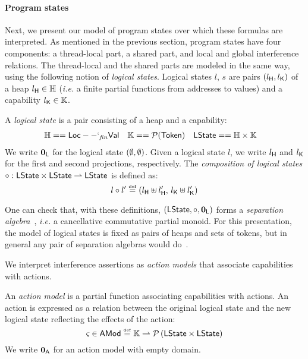 \paragraph{Program states}
Next, we present our model of program states over which these formulas
are interpreted. As mentioned in the previous section, program states
have four components: a thread-local part, a shared part, and local
and global interference relations. The thread-local and the shared
parts are modeled in the same way, using the following notion of
\emph{logical states}.  Logical states $l$, $s$ are pairs
$(l_{\textsf{H}}, l_{\textsf{K}})$ of a heap $l_{\textsf{H}}\in\mathbb{H}$
(\textit{i.e.} a finite partial functions from addresses to values)
and a capability $l_{\textsf{K}}\in\mathbb{K}$.

\begin{definition}
  A \emph{logical state} is a pair consisting of a heap and a capability:
  \begin{align*}
    \mathbb{H} &== \mathsf{Loc} --`_{\mathit{fin}} \mathsf{Val}&
    \mathbb{K} &== \mathcal{P}(\mathsf{Token})&
    \textsf{LState} &== \mathbb{H}\times \mathbb{K}
  \end{align*}
  We write $\mathbf{0}_{\textsf{L}}$ for the logical state $(\emptyset, \emptyset)$. Given
  a logical state $l$, we write $l_{\textsf{H}}$ and $l_{\textsf{K}}$ for
  the first and second projections, respectively. The
  \emph{composition of logical states}
  $
  \circ : \textsf{LState} \times \textsf{LState} \rightharpoonup \textsf{LState}
  $
  is defined as:
  \[
  l \circ l' \mathrel{\stackrel{\smash{\scriptscriptstyle{\mathrm{def}}}}{=}}
  (l_{\textsf{H}} \uplus l'_{\textsf{H}},\, l_{\textsf{K}} \uplus l'_{\textsf{K}})
  \]
\end{definition}

One can check that, with these definitions, $(\textsf{LState}, \circ,
\mathbf{0}_{\textsf{L}})$ forms a \emph{separation algebra}~\cite{asl}, \textit{i.e.} a
cancellative commutative partial monoid.  For this presentation, the
model of logical states is fixed as pairs of heaps and sets of tokens,
but in general any pair of separation algebras would
do~\cite{colosl-tr14}.


We interpret interference assertions as \emph{action models} that
associate capabilities with actions.

\begin{definition}
An \emph{action model} is a partial function associating capabilities with actions. An action is expressed as a relation between the original logical state and the new logical state reflecting the effects of the action:
\[
	\varsigma_{} \in \textsf{AMod} \mathrel{\stackrel{\smash{\scriptscriptstyle{\mathrm{def}}}}{=}} \mathbb{K} \rightharpoonup \mathcal{P}\left(\textsf{LState} \times \textsf{LState} \right)
\]
We write $\mathbf{0}_{\textsf{A}}$ for an action model with empty domain.
\end{definition}


